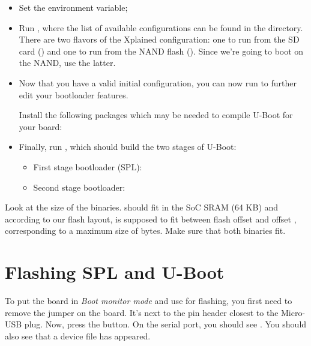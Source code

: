 \begin{itemize}

\item Set the  environment variable;

\item Run , where the list of available
  configurations can be found in the  directory. There
  are two flavors of the Xplained configuration: one to run from the
  SD card () and one to run from the NAND
  flash (). Since we're going to boot
  on the NAND, use the latter.

\item Now that you have a valid initial configuration, you can now
  run  to further edit your bootloader features.

Install the following packages which may be needed to compile U-Boot for
your board:


\item Finally, run , which should build the two stages of U-Boot:
\begin{itemize}
  \item First stage bootloader (SPL): 
  \item Second stage bootloader: 
\end{itemize}

\end{itemize}

Look at the size of the binaries.  should fit
in the SoC SRAM (64 KB) and according to our flash layout, 
is supposed to fit between flash offset  and offset ,
corresponding to a maximum size of  bytes.  Make sure that
both binaries fit.

\section{Flashing SPL and U-Boot}

To put the board in {\em Boot monitor mode} and use  for
flashing, you first need to remove the  jumper on the board.
It's next to the pin header closest to the Micro-USB plug.
Now, press the  button.  On the serial port, you should see
. You should also see that a  device
file has appeared.

